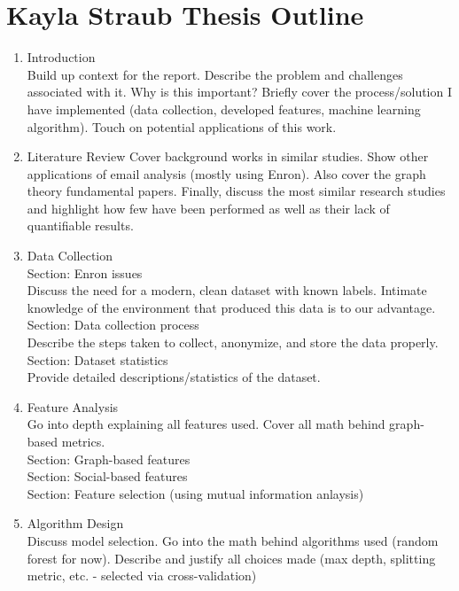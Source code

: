 \documentclass[12pt,dvips]{report}
\begin{document}
\section*{Kayla Straub Thesis Outline}
\begin{enumerate}
\item Introduction \\
Build up context for the report.  Describe the problem and challenges associated with it.  Why is this important?  Briefly cover the process/solution I have implemented (data collection, developed features, machine learning algorithm).  Touch on potential applications of this work.
\newline
\item Literature Review \newline
Cover background works in similar studies.  Show other applications of email analysis (mostly using Enron).  Also cover the graph theory fundamental papers.  Finally, discuss the most similar research studies and highlight how few have been performed as well as their lack of quantifiable results.
\newline
\item Data Collection \\
Section: Enron issues\\
Discuss the need for a modern, clean dataset with known labels.  Intimate knowledge of the environment that produced this data is to our advantage.  \\
Section: Data collection process \\ Describe the steps taken to collect, anonymize, and store the data properly.  \\
Section: Dataset statistics\\ Provide detailed descriptions/statistics of the dataset.
\item Feature Analysis\\
Go into depth explaining all features used.  Cover all math behind graph-based metrics. \\
Section: Graph-based features\\
Section: Social-based features\\
Section: Feature selection (using mutual information anlaysis)\\
\item Algorithm Design \\
Discuss model selection.  Go into the math behind algorithms used (random forest for now).  Describe and justify all choices made (max depth, splitting metric, etc. - selected via cross-validation) \\

\end{enumerate}
\end{document}
